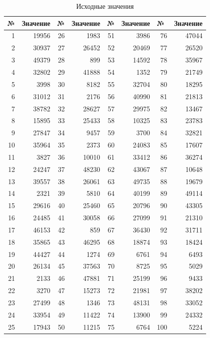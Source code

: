 \documentclass[a4paper,14pt]{extarticle}
\begin{document}
\begin{table}[h!]
	\small
	\caption{Исходные значения}
	\centering
	\begin{tabular}{|r|r|r|r|r|r|r|r|}
		\hline
		\multicolumn{1}{|l|}{№} & \multicolumn{1}{l|}{Значение} & \multicolumn{1}{l|}{№} & \multicolumn{1}{l|}{Значение} & \multicolumn{1}{l|}{№} & \multicolumn{1}{l|}{Значение} & \multicolumn{1}{l|}{№} & \multicolumn{1}{l|}{Значение} \\ \hline
		1 & 19956 & 26 & 1983 & 51 & 3986 & 76 & 47044 \\ \hline
		2 & 30937 & 27 & 26452 & 52 & 20469 & 77 & 26520 \\ \hline
		3 & 49379 & 28 & 899 & 53 & 14592 & 78 & 35967 \\ \hline
		4 & 32802 & 29 & 41888 & 54 & 1352 & 79 & 21749 \\ \hline
		5 & 3998 & 30 & 8182 & 55 & 32704 & 80 & 18295 \\ \hline
		6 & 31012 & 31 & 2176 & 56 & 40990 & 81 & 21813 \\ \hline
		7 & 38782 & 32 & 28627 & 57 & 29975 & 82 & 13467 \\ \hline
		8 & 15895 & 33 & 25433 & 58 & 10325 & 83 & 23783 \\ \hline
		9 & 27847 & 34 & 9457 & 59 & 3700 & 84 & 32821 \\ \hline
		10 & 35964 & 35 & 2373 & 60 & 24083 & 85 & 17607 \\ \hline
		11 & 3827 & 36 & 10010 & 61 & 33412 & 86 & 36274 \\ \hline
		12 & 24247 & 37 & 48230 & 62 & 43067 & 87 & 10648 \\ \hline
		13 & 39557 & 38 & 26061 & 63 & 49735 & 88 & 19679 \\ \hline
		14 & 2321 & 39 & 5810 & 64 & 40199 & 89 & 49114 \\ \hline
		15 & 29616 & 40 & 25460 & 65 & 20796 & 90 & 43305 \\ \hline
		16 & 24485 & 41 & 30058 & 66 & 27099 & 91 & 21310 \\ \hline
		17 & 46153 & 42 & 859 & 67 & 36430 & 92 & 31711 \\ \hline
		18 & 35865 & 43 & 46295 & 68 & 18874 & 93 & 18424 \\ \hline
		19 & 44427 & 44 & 1274 & 69 & 6761 & 94 & 6493 \\ \hline
		20 & 26134 & 45 & 37563 & 70 & 8725 & 95 & 5029 \\ \hline
		21 & 2133 & 46 & 47881 & 71 & 25199 & 96 & 9433 \\ \hline
		22 & 3270 & 47 & 15273 & 72 & 21981 & 97 & 38202 \\ \hline
		23 & 27499 & 48 & 1346 & 73 & 48131 & 98 & 33052 \\ \hline
		24 & 33954 & 49 & 11422 & 74 & 13900 & 99 & 24332 \\ \hline
		25 & 17943 & 50 & 11215 & 75 & 6764 & 100 & 5224 \\ \hline
	\end{tabular}
	\label{tab:source}
\end{table}
\end{document}
